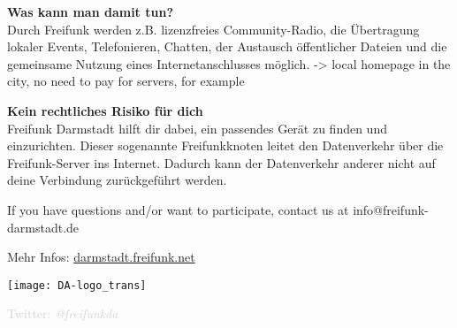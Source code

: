 \documentclass[a4paper]{article}
\begin{document}
\thispagestyle{empty}

\begin{Row}[cellsep=0.75cm]
    \begin{Cell}{1}
    \textbf{Was kann man damit tun?} \\
    Durch Freifunk werden z.B. lizenzfreies Community-Radio, die Übertragung lokaler Events, Telefonieren, Chatten, der Austausch öffentlicher Dateien und die gemeinsame Nutzung eines Internetanschlusses möglich. -> local homepage in the city, no need to pay for servers, for example
    \end{Cell}
\begin{Cell}{1}
    \textbf{Kein rechtliches Risiko für dich} \\
Freifunk Darmstadt hilft dir dabei, ein passendes Gerät zu finden und einzurichten. Dieser sogenannte Freifunkknoten leitet den Datenverkehr über die Freifunk-Server ins Internet. Dadurch kann der Datenverkehr anderer nicht auf deine Verbindung zurückgeführt werden.
\end{Cell}
\end{Row}

\vspace{1.3cm}
\begin{Row}
    \begin{Cell}{1}
	If you have questions and/or want to participate, contact us at info@freifunk-darmstadt.de
	\end{Cell}
\end{Row}
\vspace{0.5cm}
\begin{center}
	\large Mehr Infos: \url{darmstadt.freifunk.net}
\end{center}
\begin{center}
\vspace{-0.5cm}
\hspace*{-0.05 \paperwidth}\texttt{[image: DA-logo\_trans]}

\vspace{-2.7cm}
\large \textcolor{lightgrey}{Twitter: \textit{@freifunkda}}
\end{center}
\end{document}

